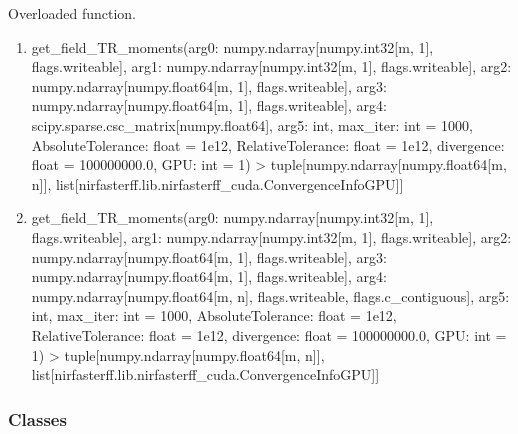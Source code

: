 \documentclass[letterpaper,10pt,english]{sphinxmanual}
\begin{document}
\begin{fulllineitems}
\label{\detokenize{_autosummary/nirfasterff.lib.nirfasterff_cuda.get_field_TR_moments:nirfasterff.lib.nirfasterff_cuda.get_field_TR_moments}}
\pysigstartsignatures
{}
\pysigstopsignatures
\sphinxAtStartPar
Overloaded function.
\begin{enumerate}
%
\item {} 
\sphinxAtStartPar
get\_field\_TR\_moments(arg0: numpy.ndarray{[}numpy.int32{[}m, 1{]}, flags.writeable{]}, arg1: numpy.ndarray{[}numpy.int32{[}m, 1{]}, flags.writeable{]}, arg2: numpy.ndarray{[}numpy.float64{[}m, 1{]}, flags.writeable{]}, arg3: numpy.ndarray{[}numpy.float64{[}m, 1{]}, flags.writeable{]}, arg4: scipy.sparse.csc\_matrix{[}numpy.float64{]}, arg5: int, max\_iter: int = 1000, AbsoluteTolerance: float = 1e\sphinxhyphen{}12, RelativeTolerance: float = 1e\sphinxhyphen{}12, divergence: float = 100000000.0, GPU: int = \sphinxhyphen{}1) \sphinxhyphen{}\textgreater{} tuple{[}numpy.ndarray{[}numpy.float64{[}m, n{]}{]}, list{[}nirfasterff.lib.nirfasterff\_cuda.ConvergenceInfoGPU{]}{]}

\item {} 
\sphinxAtStartPar
get\_field\_TR\_moments(arg0: numpy.ndarray{[}numpy.int32{[}m, 1{]}, flags.writeable{]}, arg1: numpy.ndarray{[}numpy.int32{[}m, 1{]}, flags.writeable{]}, arg2: numpy.ndarray{[}numpy.float64{[}m, 1{]}, flags.writeable{]}, arg3: numpy.ndarray{[}numpy.float64{[}m, 1{]}, flags.writeable{]}, arg4: numpy.ndarray{[}numpy.float64{[}m, n{]}, flags.writeable, flags.c\_contiguous{]}, arg5: int, max\_iter: int = 1000, AbsoluteTolerance: float = 1e\sphinxhyphen{}12, RelativeTolerance: float = 1e\sphinxhyphen{}12, divergence: float = 100000000.0, GPU: int = \sphinxhyphen{}1) \sphinxhyphen{}\textgreater{} tuple{[}numpy.ndarray{[}numpy.float64{[}m, n{]}{]}, list{[}nirfasterff.lib.nirfasterff\_cuda.ConvergenceInfoGPU{]}{]}

\end{enumerate}

\end{fulllineitems}

\subsubsection*{Classes}
\end{document}
